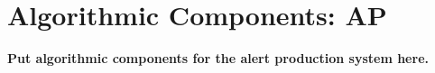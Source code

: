 \section{Algorithmic Components: AP}

{\bf Put algorithmic components for the alert production system here.}